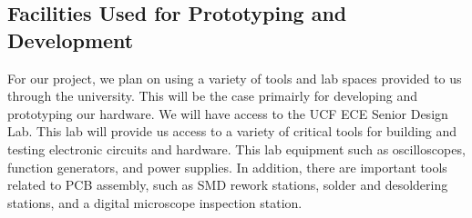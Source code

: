 \subsection{Facilities Used for Prototyping and Development}
For our project, we plan on using a variety of tools and lab spaces provided to us through the university. This will be the case primairly for developing and prototyping our hardware. We will have access to the UCF ECE Senior Design Lab. This lab will provide us access to a variety of critical tools for building and testing electronic circuits and hardware. This lab equipment such as oscilloscopes, function generators, and power supplies. In addition, there are important tools related to PCB assembly, such as SMD rework stations, solder and desoldering stations, and a digital microscope inspection station.